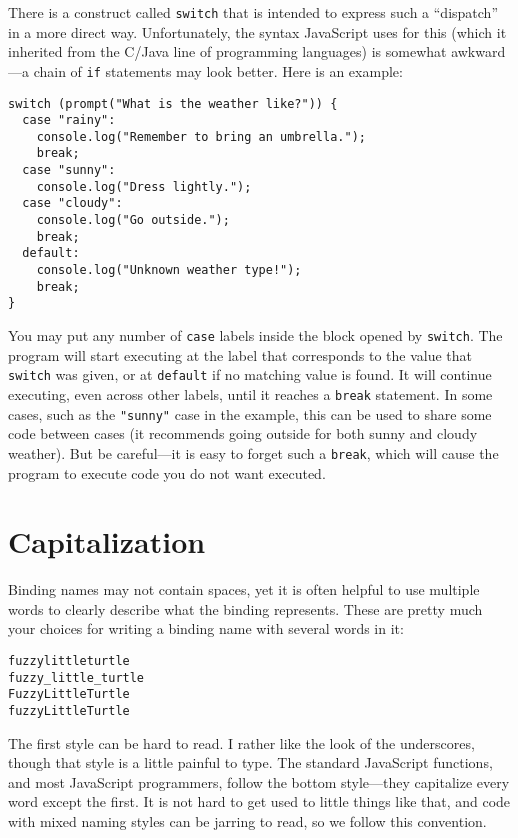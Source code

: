 There is a construct called \lstinline`switch` that is intended to express such a ``dispatch'' in a more direct way. Unfortunately, the syntax JavaScript uses for this (which it inherited from the C\slash Java line of programming languages) is somewhat awkward—a chain of \lstinline`if` statements may look better. Here is an example:

\begin{lstlisting}
switch (prompt("What is the weather like?")) {
  case "rainy":
    console.log("Remember to bring an umbrella.");
    break;
  case "sunny":
    console.log("Dress lightly.");
  case "cloudy":
    console.log("Go outside.");
    break;
  default:
    console.log("Unknown weather type!");
    break;
}
\end{lstlisting}
\noindent{}

You may put any number of \lstinline`case` labels inside the block opened by \lstinline`switch`. The program will start executing at the label that corresponds to the value that \lstinline`switch` was given, or at \lstinline`default` if no matching value is found. It will continue executing, even across other labels, until it reaches a \lstinline`break` statement. In some cases, such as the \lstinline`"sunny"` case in the example, this can be used to share some code between cases (it recommends going outside for both sunny and cloudy weather). But be careful—it is easy to forget such a \lstinline`break`, which will cause the program to execute code you do not want executed.

\section{Capitalization}

Binding names may not contain spaces, yet it is often helpful to use multiple words to clearly describe what the binding represents. These are pretty much your choices for writing a binding name with several words in it:

\begin{lstlisting}
fuzzylittleturtle
fuzzy_little_turtle
FuzzyLittleTurtle
fuzzyLittleTurtle
\end{lstlisting}
\noindent{}

The first style can be hard to read. I rather like the look of the underscores, though that style is a little painful to type. The standard JavaScript functions, and most JavaScript programmers, follow the bottom style—they capitalize every word except the first. It is not hard to get used to little things like that, and code with mixed naming styles can be jarring to read, so we follow this convention.

